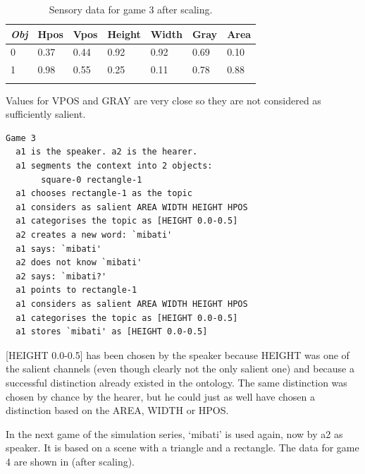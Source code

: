 \begin{table}
\begin{center}
\begin{tabular}{ l  l  l  l  l  l  l }
\lsptoprule
{\itshape Obj} & Hpos & Vpos & Height & Width & Gray & Area \\ \midrule
0 & 0.37 & 0.44 & 0.92 & 0.92 & 0.69 & 0.10\\ 
1 & 0.98 & 0.55 & 0.25 & 0.11 & 0.78 & 0.88\\ 
\lspbottomrule
\end{tabular}
\caption{\label{tab:game3} Sensory data for game 3 after scaling.}
\end{center}
\end{table}
Values for VPOS and GRAY are very close so they are not 
considered as sufficiently salient.
\begin{verbatim}
Game 3
  a1 is the speaker. a2 is the hearer. 
  a1 segments the context into 2 objects: 
       square-0 rectangle-1 
  a1 chooses rectangle-1 as the topic 
  a1 considers as salient AREA WIDTH HEIGHT HPOS 
  a1 categorises the topic as [HEIGHT 0.0-0.5]
  a2 creates a new word: `mibati'
  a1 says: `mibati'
  a2 does not know `mibati'
  a2 says: `mibati?'
  a1 points to rectangle-1
  a1 considers as salient AREA WIDTH HEIGHT HPOS 
  a1 categorises the topic as [HEIGHT 0.0-0.5]
  a1 stores `mibati' as [HEIGHT 0.0-0.5]
\end{verbatim}
{}[HEIGHT 0.0-0.5] has been chosen by the speaker
because HEIGHT was one of the salient channels (even 
though clearly not the only salient one) and 
because a successful distinction already existed in 
the ontology. The same 
distinction was chosen by chance by the hearer, but he 
could just as well have chosen a distinction based on 
the AREA, WIDTH or HPOS. 

In the next game of the simulation series, `mibati'
is used again, now by {\bfshape  a2} as speaker. It is 
based on a scene with a triangle and a rectangle.
The data for game 4 are shown in  (after scaling).  


